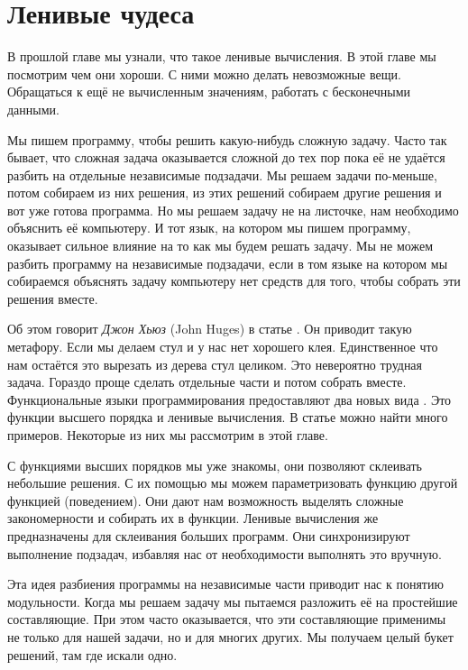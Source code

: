 \setcounter{chapter}{10}
\chapter{Ленивые чудеса}

В прошлой главе мы узнали, что такое ленивые вычисления. 
В этой главе мы посмотрим чем они хороши. С ними можно
делать невозможные вещи. Обращаться к ещё не вычисленным
значениям, работать с бесконечными данными.

Мы пишем программу, чтобы решить какую-нибудь сложную задачу.
Часто так бывает, что сложная задача оказывается сложной до тех
пор пока её не удаётся разбить на отдельные независимые
подзадачи. Мы решаем задачи по-меньше, потом собираем из
них решения, из этих решений собираем другие решения и
вот уже готова программа. Но мы решаем задачу не на листочке,
нам необходимо объяснить её компьютеру. И тот язык, на 
котором мы пишем программу, оказывает сильное влияние на то
как мы будем решать задачу. Мы не можем разбить программу
на независимые подзадачи, если в том языке на котором мы собираемся
объяснять задачу компьютеру нет средств для того, чтобы 
собрать эти решения вместе. 

Об этом говорит \emph{Джон Хьюз} (John Huges) в статье
. Он приводит
такую метафору. Если мы делаем стул и у нас нет хорошего клея.
Единственное что нам остаётся это вырезать из дерева стул 
целиком. Это невероятно трудная задача. Гораздо проще 
сделать отдельные части и потом собрать вместе. 
Функциональные языки программирования предоставляют 
два новых вида . Это функции высшего порядка 
и ленивые вычисления. В статье можно найти много 
примеров. Некоторые из них мы рассмотрим в этой главе.

С функциями высших порядков мы уже знакомы, они позволяют
склеивать небольшие решения. С их помощью мы можем параметризовать 
функцию другой функцией (поведением). Они дают нам возможность
выделять сложные закономерности и собирать их в функции.
Ленивые вычисления же предназначены для склеивания больших
программ. Они синхронизируют выполнение подзадач, избавляя
нас от необходимости выполнять это вручную.

Эта идея разбиения программы на независимые части приводит 
нас к понятию модульности. Когда мы решаем задачу мы 
пытаемся разложить её на простейшие составляющие. 
При этом часто оказывается, что эти составляющие применимы
не только для нашей задачи, но и для многих других. 
Мы получаем целый букет решений, там где искали одно.

